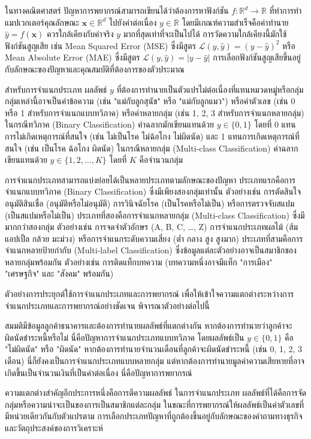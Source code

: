 ในทางคณิตศาสตร์ ปัญหาการพยากรณ์สามารถเขียนได้ว่าต้องการหาฟังก์ชัน $f: \mathbb{R}^{d} \rightarrow \mathbb{R}$ ที่ทำการทำแมปเวกเตอร์คุณลักษณะ $\mathbf{x} \in \mathbb{R}^{d}$ ไปยังค่าต่อเนื่อง $y \in \mathbb{R}$ โดยมีเกณฑ์ความสำเร็จคือค่าทำนาย $\hat{y} = f(\mathbf{x})$ ควรใกล้เคียงกับค่าจริง $y$ มากที่สุดเท่าที่จะเป็นไปได้ การวัดความใกล้เคียงนี้มักใช้ฟังก์ชันสูญเสีย เช่น Mean Squared Error (MSE) ซึ่งมีสูตร $\mathcal{L}(y, \hat{y}) = (y - \hat{y})^{2}$ หรือ Mean Absolute Error (MAE) ซึ่งมีสูตร $\mathcal{L}(y, \hat{y}) = |y - \hat{y}|$ การเลือกฟังก์ชันสูญเสียขึ้นอยู่กับลักษณะของปัญหาและคุณสมบัติที่ต้องการของตัวประมาณ

สำหรับการจำแนกประเภท ผลลัพธ์ $y$ ที่ต้องการทำนายเป็นตัวแปรไม่ต่อเนื่องที่แทนหมวดหมู่หรือกลุ่ม กลุ่มเหล่านี้อาจเป็นค่าข้อความ (เช่น "แม่กับลูกสุนัข" หรือ "แม่กับลูกแมว") หรือค่าตัวเลข (เช่น 0 หรือ 1 สำหรับการจำแนกแบบทวิภาค) หรือค่าหลายกลุ่ม (เช่น 1, 2, 3 สำหรับการจำแนกหลายกลุ่ม) ในกรณีทวิภาค (Binary Classification) ค่าฉลากมักเขียนแทนด้วย $y \in \{0, 1\}$ โดยที่ 0 แทนการไม่เกิดเหตุการณ์ที่สนใจ (เช่น ไม่เป็นโรค ไม่ฉ้อโกง ไม่ผิดนัด) และ 1 แทนการเกิดเหตุการณ์ที่สนใจ (เช่น เป็นโรค ฉ้อโกง ผิดนัด) ในกรณีหลายกลุ่ม (Multi-class Classification) ค่าฉลากเขียนแทนด้วย $y \in \{1, 2, \ldots, K\}$ โดยที่ $K$ คือจำนวนกลุ่ม

การจำแนกประเภทสามารถแบ่งย่อยได้เป็นหลายประเภทตามลักษณะของปัญหา ประเภทแรกคือการจำแนกแบบทวิภาค (Binary Classification) ซึ่งมีเพียงสองกลุ่มเท่านั้น ตัวอย่างเช่น การตัดสินใจอนุมัติสินเชื่อ (อนุมัติหรือไม่อนุมัติ) การวินิจฉัยโรค (เป็นโรคหรือไม่เป็น) หรือการตรวจจับสแปม (เป็นสแปมหรือไม่เป็น) ประเภทที่สองคือการจำแนกหลายกลุ่ม (Multi-class Classification) ซึ่งมีมากกว่าสองกลุ่ม ตัวอย่างเช่น การจดจำตัวอักษร (A, B, C, \ldots, Z) การจำแนกประเภทผลไม้ (ส้ม แอปเปิ้ล กล้วย มะม่วง) หรือการจำแนกระดับความเสี่ยง (ต่ำ กลาง สูง สูงมาก) ประเภทที่สามคือการจำแนกหลายป้ายกำกับ (Multi-label Classification) ซึ่งข้อมูลแต่ละตัวอย่างอาจเป็นสมาชิกของหลายกลุ่มพร้อมกัน ตัวอย่างเช่น การติดแท็กบทความ (บทความหนึ่งอาจมีแท็ก "การเมือง" "เศรษฐกิจ" และ "สังคม" พร้อมกัน)

\begin{myBox}[]{ตัวอย่างการประยุกต์ใช้การจำแนกประเภทและการพยากรณ์}{}
เพื่อให้เข้าใจความแตกต่างระหว่างการจำแนกประเภทและการพยากรณ์อย่างชัดเจน พิจารณาตัวอย่างต่อไปนี้

สมมติมีข้อมูลลูกค้าธนาคารและต้องการทำนายผลลัพธ์ที่แตกต่างกัน หากต้องการทำนายว่าลูกค้าจะผิดนัดชำระหนี้หรือไม่ นี่คือปัญหาการจำแนกประเภทแบบทวิภาค โดยผลลัพธ์เป็น $y \in \{0, 1\}$ คือ "ไม่ผิดนัด" หรือ "ผิดนัด" หากต้องการทำนายจำนวนเดือนที่ลูกค้าจะผิดนัดชำระหนี้ (เช่น 0, 1, 2, 3 เดือน) นี่ก็ยังคงเป็นการจำแนกประเภทแบบหลายกลุ่ม แต่หากต้องการทำนายมูลค่าความเสียหายที่อาจเกิดขึ้นเป็นจำนวนเงินที่เป็นค่าต่อเนื่อง นี่คือปัญหาการพยากรณ์

ความแตกต่างสำคัญอีกประการหนึ่งคือการตีความผลลัพธ์ ในการจำแนกประเภท ผลลัพธ์ที่ได้คือการจัดกลุ่มหรือความน่าจะเป็นของการเป็นสมาชิกแต่ละกลุ่ม ในขณะที่การพยากรณ์ให้ผลลัพธ์เป็นค่าตัวเลขที่มีหน่วยเดียวกันกับตัวแปรตาม การเลือกประเภทปัญหาที่ถูกต้องขึ้นอยู่กับลักษณะของคำถามทางธุรกิจและวัตถุประสงค์ของการวิเคราะห์
\end{myBox}

